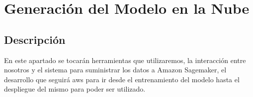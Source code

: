 \documentclass[12pt, a4paper, titlepage]{report}
\begin{document}
		\newpage
	
	\section{Generación del Modelo en la Nube} %
	\subsection{Descripción}
	
	En este apartado se tocarán herramientas que utilizaremos, la interacción entre nosotros y el sistema para suministrar los datos a Amazon Sagemaker, el desarrollo que seguirá \acrshort{aws} para ir desde el entrenamiento del modelo hasta el despliegue del mismo para poder ser utilizado.
	
\end{document}
